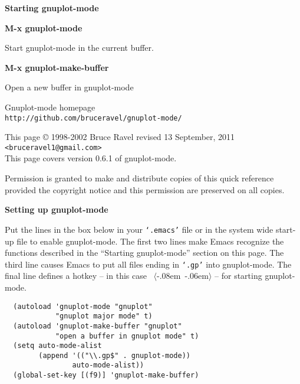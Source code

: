 \documentclass[twocolumn]{article}
\newenvironment{Boxedminipage}%
{\begin{Sbox}\begin{minipage}}%
  {\end{minipage}\end{Sbox}\Ovalbox{\TheSbox}}
\newenvironment{SqBoxedminipage}%
{\begin{Sbox}\begin{minipage}}%
  {\end{minipage}\end{Sbox}\fbox{\TheSbox}}
\def\version{{0.6.1}}
\def\revised{{13 September, 2011}}
\def\file#1{{\texttt{`#1'}}}
\def\key#1{{\textrm \leavevmode\hbox{%
  \raise0.4pt\hbox{$\langle$}\kern-.08em\vtop{%
    \vbox{\hrule\kern-0.4pt
     \hbox{\raise0.4pt\hbox{\vphantom{$\langle$}}#1}}%
    \kern-0.4pt\hrule}%
  \kern-.06em\raise0.4pt\hbox{$\rangle$}}}}
\def\command#1#2{{
    \vspace{-0.2truecm}
    \begin{flushright}
      \begin{minipage}[h]{0.97\linewidth}
        \vspace{-0.2truecm}
        \textbf{#1}\hfill
        \begin{flushright}
          \begin{minipage}[h]{0.93\linewidth}
            \vspace{-0.4truecm}
            #2
          \end{minipage}
        \end{flushright}
      \end{minipage}
    \end{flushright}
    }}
\begin{document}
\vspace{4ex}

\centerline{{\large\textbf{Starting gnuplot-mode}}}
\vspace{2ex}

\command{M-x gnuplot-mode}{Start gnuplot-mode in the current buffer.}
%
\command{M-x gnuplot-make-buffer}{Open a new buffer in gnuplot-mode}



\vfill

\begin{Boxedminipage}{1.05\linewidth}
  \begin{center}
    \footnotesize{Gnuplot-mode homepage} \\
    \scriptsize{%
      \texttt{http://github.com/bruceravel/gnuplot-mode/}}
  \end{center}
\end{Boxedminipage}
\begin{flushleft}
  {\footnotesize
    This page {\copyright} 1998-2002 Bruce Ravel \hfill revised \revised \\
    \texttt{<bruceravel1@gmail.com>} \\ %
    This page covers version {\version} of gnuplot-mode.

    Permission is granted to make and distribute copies of this quick
    reference provided the copyright notice and this permission are
    preserved on all copies.}
\end{flushleft}
\pagebreak
\centerline{{\large\textbf{Setting up gnuplot-mode}}}
\vspace{2ex}

Put the lines in the box below in your \file{.emacs} file or in the
system wide start-up file to enable gnuplot-mode.  The first two lines
make Emacs recognize the functions described in the ``Starting
gnuplot-mode'' section on this page.  The third line causes Emacs to
put all files ending in \file{.gp} into gnuplot-mode.  The final line
defines a hotkey -- in this case \key{F9} -- for starting
gnuplot-mode.

\begin{SqBoxedminipage}{\linewidth}
\begin{Verbatim}
  (autoload 'gnuplot-mode "gnuplot"
            "gnuplot major mode" t)
  (autoload 'gnuplot-make-buffer "gnuplot"
            "open a buffer in gnuplot mode" t)
  (setq auto-mode-alist
        (append '(("\\.gp$" . gnuplot-mode))
                auto-mode-alist))
  (global-set-key [(f9)] 'gnuplot-make-buffer)
\end{Verbatim}%
\end{SqBoxedminipage}
\end{document}
